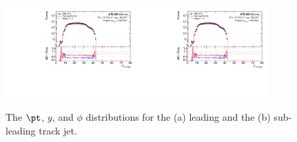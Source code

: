 \begin{figure}[h!]
  \includegraphics[page=88,width=0.45\textwidth]{figures/ZjetOmnifoldMCDataComp.pdf}\includegraphics[page=92,width=0.45\textwidth]{figures/ZjetOmnifoldMCDataComp.pdf} \\
  \caption{The $\pt$, $y$, and $\phi$ distributions for the (a) leading and the (b) sub-leading track jet.}
  \label{fig:pTyjets}
\end{figure}

